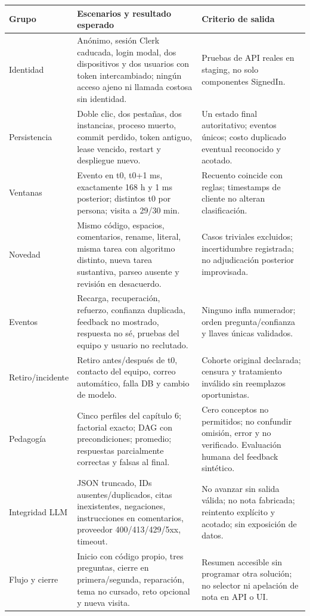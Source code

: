 \documentclass[11pt,a4paper]{report}
\begin{document}
\begin{longtable}{P{2.4cm}P{8cm}P{5.5cm}}
\toprule Grupo & Escenarios y resultado esperado & Criterio de salida \\\midrule\endhead
Identidad & Anónimo, sesión Clerk caducada, login modal, dos dispositivos y dos usuarios con token intercambiado; ningún acceso ajeno ni llamada costosa sin identidad. & Pruebas de API reales en staging, no solo componentes SignedIn.\\
Persistencia & Doble clic, dos pestañas, dos instancias, proceso muerto, commit perdido, token antiguo, lease vencido, restart y despliegue nuevo. & Un estado final autoritativo; eventos únicos; costo duplicado eventual reconocido y acotado.\\
Ventanas & Evento en t0, t0+1 ms, exactamente 168 h y 1 ms posterior; distintos t0 por persona; visita a 29/30 min. & Recuento coincide con reglas; timestamps de cliente no alteran clasificación.\\
Novedad & Mismo código, espacios, comentarios, rename, literal, misma tarea con algoritmo distinto, nueva tarea sustantiva, parseo ausente y revisión en desacuerdo. & Casos triviales excluidos; incertidumbre registrada; no adjudicación posterior improvisada.\\
Eventos & Recarga, recuperación, refuerzo, confianza duplicada, feedback no mostrado, respuesta no sé, pruebas del equipo y usuario no reclutado. & Ninguno infla numerador; orden pregunta/confianza y llaves únicas validados.\\
Retiro/incidente & Retiro antes/después de t0, contacto del equipo, correo automático, falla DB y cambio de modelo. & Cohorte original declarada; censura y tratamiento inválido sin reemplazos oportunistas.\\
Pedagogía & Cinco perfiles del capítulo 6; factorial exacto; DAG con precondiciones; promedio; respuestas parcialmente correctas y falsas al final. & Cero conceptos no permitidos; no confundir omisión, error y no verificado. Evaluación humana del feedback sintético.\\
Integridad LLM & JSON truncado, IDs ausentes/duplicados, citas inexistentes, negaciones, instrucciones en comentarios, proveedor 400/413/429/5xx, timeout. & No avanzar sin salida válida; no nota fabricada; reintento explícito y acotado; sin exposición de datos.\\
Flujo y cierre & Inicio con código propio, tres preguntas, cierre en primera/segunda, reparación, tema no cursado, reto opcional y nueva visita. & Resumen accesible sin programar otra solución; no selector ni apelación de nota en API o UI.\\

\end{longtable}
\end{document}
